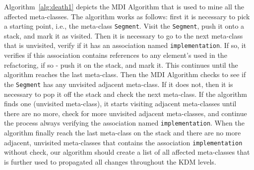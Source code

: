 Algorithm~\ref{alg:death1} depicts the MDI Algorithm that is used to mine all the affected meta-classes. %
%
The algorithm works as follows: first it is necessary to pick a starting point, i.e., the meta-class \texttt{Segment}. Visit the \texttt{Segment}, push it onto a stack, and mark it as visited. Then it is necessary to go to the next meta-class that is unvisited, verify if it has an association named \texttt{implementation}. If so, it verifies if this association contains references to any element's used in the refactoring, if so - push it on the stack, and mark it. This continues until the algorithm reaches the last meta-class. Then the MDI Algorithm checks to see if the \texttt{Segment} has any unvisited adjacent meta-class. If it does not, then it is necessary to pop it off the stack and check the next meta-class. If the algorithm finds one (unvisited meta-class), it starts visiting adjacent meta-classes until there are no more, check for more unvisited adjacent meta-classes, and continue the process always verifying the association named \texttt{implementation}. When the algorithm finally reach the last meta-class on the stack and there are no more adjacent, unvisited meta-classes that contains the association \texttt{implementation} without check, our algorithm should create a list of all affected meta-classes that is further used to propagated all changes throughout the KDM levels. 
%
%
%
%
%
%
%
%
%












